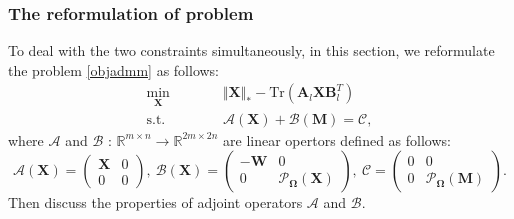 \documentclass{article}
\begin{document}
{\subsubsection{The reformulation of problem }
To deal with the two constraints simultaneously, in this section, we reformulate the problem \ref{objadmm} as follows:
\begin{equation}
    \begin{aligned}
        \underset{\mathbf X}{\min}\qquad&\quad \Vert\mathbf X \Vert_* - \text{Tr}(\mathbf A_l\mathbf X\mathbf B_l^T) \\
        \text{s.t.}\qquad&\quad   \mathcal{A}(\mathbf X) + \mathcal{B}(\mathbf M) = \mathcal{C},
    \end{aligned}\label{apobj}
\end{equation}
where $\mathcal{A}$ and $\mathcal{B}$ : $\mathbb{R}^{m\times n} \rightarrow \mathbb{R}^{2m\times 2n}$ are linear opertors defined as follows:
\begin{equation*}
    \mathcal{A}(\mathbf X) = \begin{pmatrix}
        \mathbf X & 0 \\
        0 & 0
    \end{pmatrix}, \
    \mathcal{B}(\mathbf X) = \begin{pmatrix}
        -\mathbf W & 0 \\
        0 & \mathcal{P}_{\mathbf\Omega}(\mathbf X)
    \end{pmatrix}, \ 
    \mathcal{C} = \begin{pmatrix}
        0 & 0 \\
        0 & \mathcal{P}_{\mathbf\Omega}(\mathbf M)
    \end{pmatrix}.
\end{equation*}
Then discuss the properties of adjoint operators $\mathcal{A}$ and $\mathcal{B}$.

}
\end{document}
